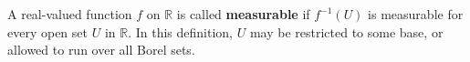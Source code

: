 A real-valued function $f$ on $\mathbb{R}$ is called \textbf{measurable} if $f^{-1}(U)$ is measurable for every open set $U$ in $\mathbb{R}$. In this definition, $U$ may be restricted to some base, or allowed to run over all Borel sets.
